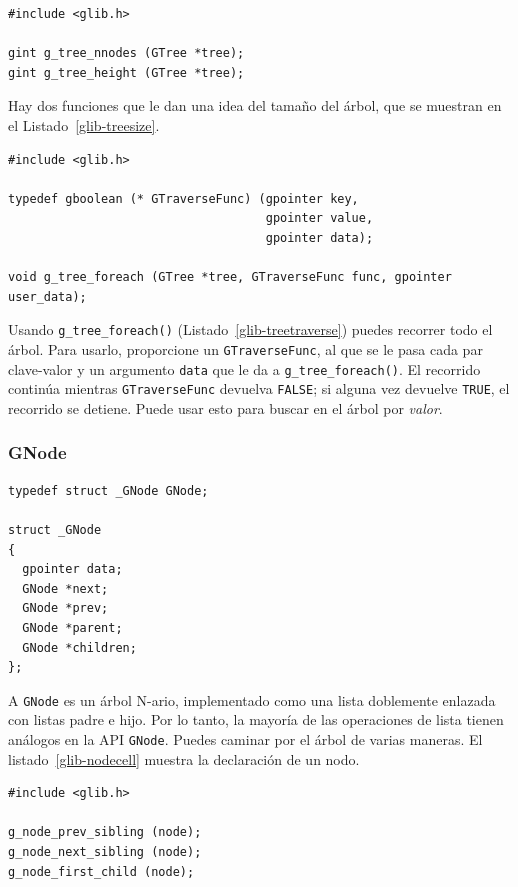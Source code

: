 \begin{lstlisting}[float, caption={Determining the size of a \lstinline{GTree}}, label=glib-treesize]
#include <glib.h>

gint g_tree_nnodes (GTree *tree);
gint g_tree_height (GTree *tree);
\end{lstlisting}

Hay dos funciones que le dan una idea del tamaño del árbol, que se muestran en el Listado~\ref{glib-treesize}.

\begin{lstlisting}[float, caption={Traversing a \lstinline{GTree}}, label=glib-treetraverse]
#include <glib.h>

typedef gboolean (* GTraverseFunc) (gpointer key,
                                    gpointer value,
                                    gpointer data);

void g_tree_foreach (GTree *tree, GTraverseFunc func, gpointer user_data);
\end{lstlisting}

Usando \lstinline{g_tree_foreach()} (Listado~\ref{glib-treetraverse}) puedes recorrer todo el árbol. Para usarlo, proporcione un \lstinline{GTraverseFunc}, al que se le pasa cada par clave-valor y un argumento \lstinline{data} que le da a \lstinline{g_tree_foreach()}. El recorrido continúa mientras \lstinline{GTraverseFunc} devuelva \lstinline{FALSE}; si alguna vez devuelve \lstinline{TRUE}, el recorrido se detiene. Puede usar esto para buscar en el árbol por \emph{valor}.

\subsubsection{GNode}

\begin{lstlisting}[float, caption={\lstinline{GNode} cell}, label=glib-nodecell]
typedef struct _GNode GNode;

struct _GNode
{
  gpointer data;
  GNode *next;
  GNode *prev;
  GNode *parent;
  GNode *children;
};
\end{lstlisting}

A \lstinline{GNode} es un árbol N-ario, implementado como una lista doblemente enlazada con listas padre e hijo. Por lo tanto, la mayoría de las operaciones de lista tienen análogos en la API \lstinline{GNode}. Puedes caminar por el árbol de varias maneras. El listado~\ref{glib-nodecell} muestra la declaración de un nodo.

\begin{lstlisting}[float, caption={Accessing \lstinline{GNode}}, label=glib-nodeaccess]
#include <glib.h>

g_node_prev_sibling (node);
g_node_next_sibling (node);
g_node_first_child (node);
\end{lstlisting}

